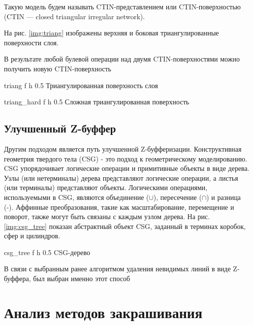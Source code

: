 Такую модель будем называть
CTIN-представлением или CTIN-поверхностью
(CTIN — closed triangular irregular network).\cite{binary_CTIN}\newline

На рис. \ref{img:triang} изображены верхняя и боковая триангулированные поверхности слоя.

В результате любой булевой операции над двумя CTIN-поверхностями можно получить новую CTIN-поверхность

{triang} %
{f} %
{h} %
{0.5\textwidth} %
{Триангулированная поверхность слоя} %

{triang_hard} %
{f} %
{h} %
{0.5\textwidth} %
{Сложная триангулированная поверхность} %

\subsection{Улучшенный Z-буффер}
Другим подходом является путь улучшенной Z-буфферизации.
Конструктивная геометрия твердого тела (CSG) - это подход к геометрическому
моделированию. CSG упорядочивает логические операции и примитивные объекты
в виде дерева. Узлы (или нетерминалы) дерева представляют
логические операции, а листья (или терминалы) представляют объекты.
Логическими операциями, используемыми в CSG, являются объединение (\(\cup\)), пересечение
(\(\cap\)) и разница (-). Аффинные преобразования, такие как масштабирование, перемещение и поворот,
также могут быть связаны с каждым узлом дерева. На рис. \ref{img:csg_tree} показан абстрактный объект CSG, заданный в терминах коробок,
сфер и цилиндров. \cite{binary_Z}

{csg_tree} %
{f} %
{h} %
{0.5\textwidth} %
{CSG-дерево} %

В связи с выбранным ранее алгоритмом удаления невидимых линий в виде Z-буффера, был выбран именно этот способ

\section{Анализ методов закрашивания}

